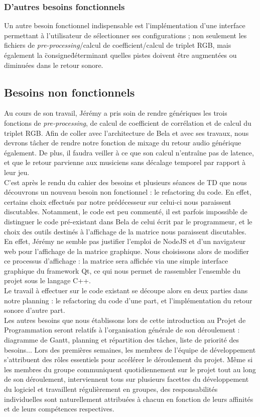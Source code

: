 \subsubsection{D'autres besoins fonctionnels}
Un autre besoin fonctionnel indispensable est l'implémentation d'une
interface permettant à l'utilisateur de sélectionner ses
configurations ; non seulement les fichiers de
\textit{pre-processing}/calcul de coefficient/calcul de triplet RGB,
mais également la \"consigne\" déterminant quelles pistes doivent être
augmentées ou diminuées dans le retour sonore. \\

\subsection{Besoins non fonctionnels}
Au cours de son travail, Jérémy a pris soin de rendre génériques les
trois fonctions de \textit{pre-processing}, de calcul de coefficient
de corrélation et de calcul du triplet RGB. Afin de coller avec
l'architecture de Bela et avec ses travaux, nous devrons tâcher de
rendre notre fonction de mixage du retour audio générique
également. De plus, il faudra veiller à ce que son calcul n'entraîne
pas de latence, et que le retour parvienne aux musiciens sans décalage
temporel par rapport à leur jeu. \\ C'est après le rendu du cahier des
besoins et plusieurs séances de TD que nous découvrons un nouveau
besoin non fonctionnel : le refactoring du code. En effet, certains
choix effectués par notre prédécesseur sur celui-ci nous paraissent
discutables. Notamment, le code est peu commenté, il est parfois
impossible de distinguer le code pré-existant dans Bela de celui écrit
par le programmeur, et le choix des outils destinés à l'affichage de
la matrice nous paraissent discutables. En effet, Jérémy ne semble pas
justifier l'emploi de NodeJS et d'un navigateur web pour l'affichage
de la matrice graphique. Nous choisissons alors de modifier ce
processus d'affichage : la matrice sera affichée via une simple
interface graphique du framework Qt, ce qui nous permet de rassembler
l'ensemble du projet sous le langage C++. \\ Le travail à effectuer
sur le code existant se découpe alors en deux parties dans notre
planning : le refactoring du code d'une part, et l'implémentation du
retour sonore d'autre part. \\
Les autres besoins que nous établissons lors de cette introduction au
Projet de Programmation seront relatifs à l'organisation générale de
son déroulement : diagramme de Gantt, planning et répartition des
tâches, liste de priorité des besoins... Lors des premières semaines,
les membres de l'équipe de développement s'attribuent des rôles
essentiels pour accélérer le déroulement du projet. Même si les
membres du groupe communiquent quotidiennement sur le projet tout au
long de son déroulement, interviennent tous sur plusieurs facettes du
développement du logiciel et travaillent régulièrement en groupes, des
responsabilités individuelles sont naturellement attribuées à chacun
en fonction de leurs affinités et de leurs compétences respectives.

